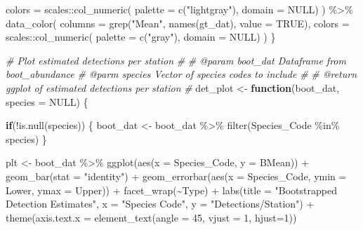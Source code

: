 \documentclass[
]{article}
\newenvironment{Shaded}{\begin{snugshade}}{\end{snugshade}}
\newcommand{\AttributeTok}[1]{\textcolor[rgb]{0.77,0.63,0.00}{#1}}
\newcommand{\CommentTok}[1]{\textcolor[rgb]{0.56,0.35,0.01}{\textit{#1}}}
\newcommand{\ConstantTok}[1]{\textcolor[rgb]{0.00,0.00,0.00}{#1}}
\newcommand{\ControlFlowTok}[1]{\textcolor[rgb]{0.13,0.29,0.53}{\textbf{#1}}}
\newcommand{\DecValTok}[1]{\textcolor[rgb]{0.00,0.00,0.81}{#1}}
\newcommand{\FunctionTok}[1]{\textcolor[rgb]{0.00,0.00,0.00}{#1}}
\newcommand{\NormalTok}[1]{#1}
\newcommand{\OtherTok}[1]{\textcolor[rgb]{0.56,0.35,0.01}{#1}}
\newcommand{\SpecialCharTok}[1]{\textcolor[rgb]{0.00,0.00,0.00}{#1}}
\newcommand{\StringTok}[1]{\textcolor[rgb]{0.31,0.60,0.02}{#1}}
\begin{document}
\begin{Shaded}
\begin{Highlighting}[]
      \AttributeTok{colors =}\NormalTok{ scales}\SpecialCharTok{::}\FunctionTok{col\_numeric}\NormalTok{(}
        \AttributeTok{palette =} \FunctionTok{c}\NormalTok{(}\StringTok{"lightgray"}\NormalTok{),}
        \AttributeTok{domain =} \ConstantTok{NULL}\NormalTok{)}
\NormalTok{    ) }\SpecialCharTok{\%\textgreater{}\%}
    \FunctionTok{data\_color}\NormalTok{(}
      \AttributeTok{columns =} \FunctionTok{grep}\NormalTok{(}\StringTok{"Mean"}\NormalTok{, }\FunctionTok{names}\NormalTok{(gt\_dat), }\AttributeTok{value =} \ConstantTok{TRUE}\NormalTok{),}
      \AttributeTok{colors =}\NormalTok{ scales}\SpecialCharTok{::}\FunctionTok{col\_numeric}\NormalTok{(}
        \AttributeTok{palette =} \FunctionTok{c}\NormalTok{(}\StringTok{"gray"}\NormalTok{),}
        \AttributeTok{domain =} \ConstantTok{NULL}\NormalTok{)}
\NormalTok{    )}
\NormalTok{\}}

\CommentTok{\# Plot estimated detections per station}
\CommentTok{\# }
\CommentTok{\# @param boot\_dat Dataframe from boot\_abundance}
\CommentTok{\# @parm species Vector of species codes to include}
\CommentTok{\#}
\CommentTok{\# @return ggplot of estimated detections per station}
\CommentTok{\#}
\NormalTok{det\_plot }\OtherTok{\textless{}{-}} \ControlFlowTok{function}\NormalTok{(boot\_dat, }\AttributeTok{species =} \ConstantTok{NULL}\NormalTok{) \{}
  
  \ControlFlowTok{if}\NormalTok{(}\SpecialCharTok{!}\FunctionTok{is.null}\NormalTok{(species)) \{}
\NormalTok{    boot\_dat }\OtherTok{\textless{}{-}}\NormalTok{ boot\_dat }\SpecialCharTok{\%\textgreater{}\%}
                  \FunctionTok{filter}\NormalTok{(Species\_Code }\SpecialCharTok{\%in\%}\NormalTok{ species)}
\NormalTok{  \}}
  
\NormalTok{  plt }\OtherTok{\textless{}{-}}\NormalTok{ boot\_dat }\SpecialCharTok{\%\textgreater{}\%}
          \FunctionTok{ggplot}\NormalTok{(}\FunctionTok{aes}\NormalTok{(}\AttributeTok{x =}\NormalTok{ Species\_Code, }\AttributeTok{y =}\NormalTok{ BMean)) }\SpecialCharTok{+}
          \FunctionTok{geom\_bar}\NormalTok{(}\AttributeTok{stat =} \StringTok{"identity"}\NormalTok{) }\SpecialCharTok{+}
          \FunctionTok{geom\_errorbar}\NormalTok{(}\FunctionTok{aes}\NormalTok{(}\AttributeTok{x =}\NormalTok{ Species\_Code, }\AttributeTok{ymin =}\NormalTok{ Lower, }\AttributeTok{ymax =}\NormalTok{ Upper)) }\SpecialCharTok{+}
          \FunctionTok{facet\_wrap}\NormalTok{(}\SpecialCharTok{\textasciitilde{}}\NormalTok{Type) }\SpecialCharTok{+}
          \FunctionTok{labs}\NormalTok{(}\AttributeTok{title =} \StringTok{"Bootstrapped Detection Estimates"}\NormalTok{,}
               \AttributeTok{x =} \StringTok{"Species Code"}\NormalTok{,}
               \AttributeTok{y =} \StringTok{"Detections/Station"}\NormalTok{) }\SpecialCharTok{+}
          \FunctionTok{theme}\NormalTok{(}\AttributeTok{axis.text.x =} \FunctionTok{element\_text}\NormalTok{(}\AttributeTok{angle =} \DecValTok{45}\NormalTok{, }\AttributeTok{vjust =} \DecValTok{1}\NormalTok{, }\AttributeTok{hjust=}\DecValTok{1}\NormalTok{)) }
  

\end{Highlighting}
\end{Shaded}
\end{document}
